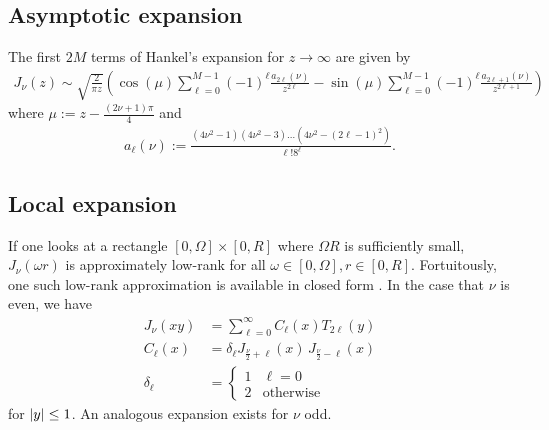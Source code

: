 
\subsection{Asymptotic expansion}

The first $2M$ terms of Hankel's expansion for $z \to \infty$ are given by
\begin{align} \label{eq:asymptotic-expansion}
    J_\nu(z)
    \sim \sqrt{\frac{2}{\pi z}} \left( 
        \cos\left(\mu\right) \sum_{\ell=0}^{M-1} (-1)^\ell \frac{a_{2\ell}(\nu)}{z^{2\ell}}
        - \sin\left(\mu\right) \sum_{\ell=0}^{M-1} (-1)^\ell \frac{a_{2\ell+1}(\nu)}{z^{2\ell+1}}
        \right)
\end{align}
where $\mu := z - \frac{(2\nu+1)\pi}{4}$ and 
\begin{align}
    a_\ell(\nu) := \frac{(4\nu^2 - 1)(4\nu^2 - 3)\dots(4\nu^2 - (2\ell-1)^2)}{\ell! 8^\ell}.
\end{align}



\subsection{Local expansion}

If one looks at a rectangle $[0, \Omega] \times [0, R]$ where $\Omega R$ is
sufficiently small, $J_\nu(\omega r)$ is approximately low-rank for all $\omega
\in [0, \Omega], r \in [0, R]$. Fortuitously, one such low-rank approximation is
available in closed form \cite{wimp1962polynomial}. In the case that $\nu$ is
even, we have
\begin{align}
    J_\nu(xy) 
    &= \sum_{\ell=0}^\infty C_\ell(x) T_{2\ell}(y) \\
    C_\ell(x) 
    &= \delta_\ell J_{\frac{\nu}{2} + \ell}(x) \, J_{\frac{\nu}{2} - \ell}(x) \\
    \delta_\ell 
    &= \begin{cases}
        1 & \ell=0 \\
        2 & \text{otherwise}
    \end{cases}
\end{align}
for $\left|y\right| \leq 1$. An analogous expansion exists for $\nu$ odd.

